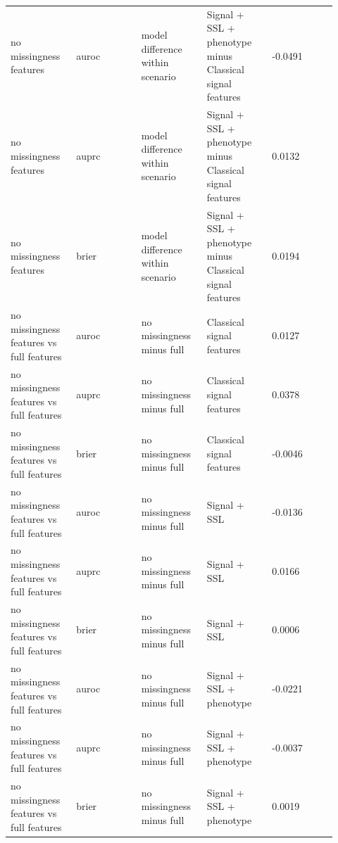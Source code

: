 \documentclass[11pt]{article}
\begin{document}
\begin{landscape}
\begin{longtable}{L{0.184\linewidth} L{0.184\linewidth} L{0.184\linewidth} L{0.184\linewidth} L{0.184\linewidth}}
no missingness features & auroc & model difference within scenario & Signal + SSL + phenotype minus Classical signal features & -\allowbreak{}0.\allowbreak{}0491 \\
no missingness features & auprc & model difference within scenario & Signal + SSL + phenotype minus Classical signal features & 0.\allowbreak{}0132 \\
no missingness features & brier & model difference within scenario & Signal + SSL + phenotype minus Classical signal features & 0.\allowbreak{}0194 \\
no missingness features vs full features & auroc & no missingness minus full & Classical signal features & 0.\allowbreak{}0127 \\
no missingness features vs full features & auprc & no missingness minus full & Classical signal features & 0.\allowbreak{}0378 \\
no missingness features vs full features & brier & no missingness minus full & Classical signal features & -\allowbreak{}0.\allowbreak{}0046 \\
no missingness features vs full features & auroc & no missingness minus full & Signal + SSL & -\allowbreak{}0.\allowbreak{}0136 \\
no missingness features vs full features & auprc & no missingness minus full & Signal + SSL & 0.\allowbreak{}0166 \\
no missingness features vs full features & brier & no missingness minus full & Signal + SSL & 0.\allowbreak{}0006 \\
no missingness features vs full features & auroc & no missingness minus full & Signal + SSL + phenotype & -\allowbreak{}0.\allowbreak{}0221 \\
no missingness features vs full features & auprc & no missingness minus full & Signal + SSL + phenotype & -\allowbreak{}0.\allowbreak{}0037 \\
no missingness features vs full features & brier & no missingness minus full & Signal + SSL + phenotype & 0.\allowbreak{}0019 \\
\end{longtable}
\normalsize
\end{landscape}
\end{document}
